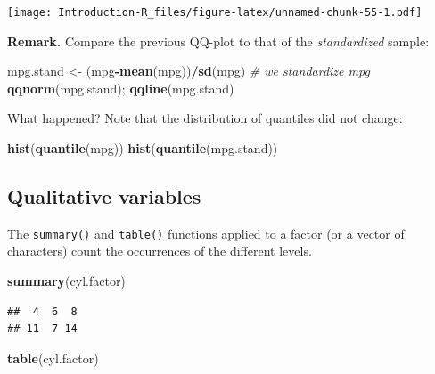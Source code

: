 \documentclass[]{book}
\newenvironment{Shaded}{\begin{snugshade}}{\end{snugshade}}
\newcommand{\CommentTok}[1]{\textcolor[rgb]{0.56,0.35,0.01}{\textit{#1}}}
\newcommand{\KeywordTok}[1]{\textcolor[rgb]{0.13,0.29,0.53}{\textbf{#1}}}
\newcommand{\NormalTok}[1]{#1}
\newcommand{\OperatorTok}[1]{\textcolor[rgb]{0.81,0.36,0.00}{\textbf{#1}}}
\newcommand{\StringTok}[1]{\textcolor[rgb]{0.31,0.60,0.02}{#1}}
\begin{document}
\texttt{[image: Introduction-R\_files/figure-latex/unnamed-chunk-55-1.pdf]}

\textbf{Remark.} Compare the previous QQ-plot to that of the \emph{standardized} sample:

\begin{Shaded}
\begin{Highlighting}[]
\NormalTok{mpg.stand <-}\StringTok{ }\NormalTok{(mpg}\OperatorTok{-}\KeywordTok{mean}\NormalTok{(mpg))}\OperatorTok{/}\KeywordTok{sd}\NormalTok{(mpg) }\CommentTok{# we standardize mpg}
\KeywordTok{qqnorm}\NormalTok{(mpg.stand); }\KeywordTok{qqline}\NormalTok{(mpg.stand)}
\end{Highlighting}
\end{Shaded}

What happened? Note that the distribution of quantiles did not change:

\begin{Shaded}
\begin{Highlighting}[]
\KeywordTok{hist}\NormalTok{(}\KeywordTok{quantile}\NormalTok{(mpg))}
\KeywordTok{hist}\NormalTok{(}\KeywordTok{quantile}\NormalTok{(mpg.stand))}
\end{Highlighting}
\end{Shaded}

\hypertarget{qualitative-variables}{%
\subsection{Qualitative variables}\label{qualitative-variables}}

The \texttt{summary()} and \texttt{table()} functions applied to a factor (or a vector of characters) count the occurrences of the different levels.

\begin{Shaded}
\begin{Highlighting}[]
\KeywordTok{summary}\NormalTok{(cyl.factor)}
\end{Highlighting}
\end{Shaded}

\begin{verbatim}
##  4  6  8 
## 11  7 14
\end{verbatim}

\begin{Shaded}
\begin{Highlighting}[]
\KeywordTok{table}\NormalTok{(cyl.factor)}
\end{Highlighting}
\end{Shaded}
\end{document}
